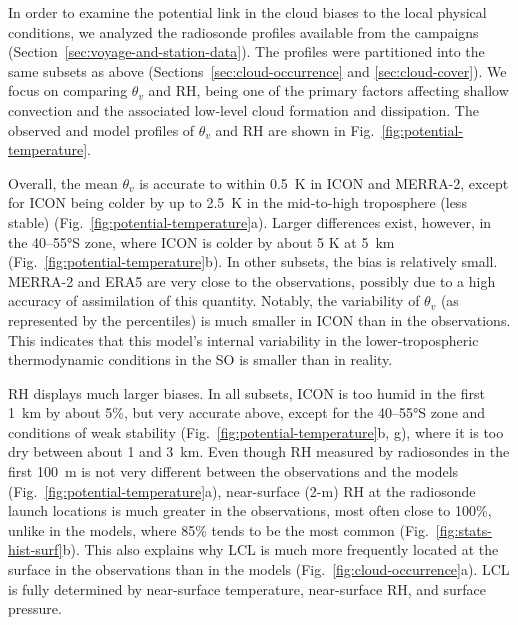 \documentclass[draft]{agujournal2019}
\begin{document}
In order to examine the potential link in the cloud biases to the local physical conditions, we analyzed the radiosonde profiles available from the campaigns (Section~\ref{sec:voyage-and-station-data}). The profiles were partitioned into the same subsets as above (Sections~\ref{sec:cloud-occurrence} and \ref{sec:cloud-cover}). We focus on comparing $\theta_v$ and RH, being one of the primary factors affecting shallow convection and the associated low-level cloud formation and dissipation. The observed and model profiles of $\theta_v$ and RH are shown in Fig.~\ref{fig:potential-temperature}.

Overall, the mean $\theta_v$ is accurate to within 0.5~K in ICON and MERRA-2, except for ICON being colder by up to 2.5~K in the mid-to-high troposphere (less stable) (Fig.~\ref{fig:potential-temperature}a). Larger differences exist, however, in the 40–55°S zone, where ICON is colder by about 5 K at 5~km (Fig.~\ref{fig:potential-temperature}b). In other subsets, the bias is relatively small. MERRA-2 and ERA5 are very close to the observations, possibly due to a high accuracy of assimilation of this quantity. Notably, the variability of $\theta_v$ (as represented by the percentiles) is much smaller in ICON than in the observations. This indicates that this model's internal variability in the lower-tropospheric thermodynamic conditions in the SO is smaller than in reality.

RH displays much larger biases. In all subsets, ICON is too humid in the first 1~km by about 5\%, but very accurate above, except for the 40–55°S zone and conditions of weak stability (Fig.~\ref{fig:potential-temperature}b, g), where it is too dry between about 1 and 3~km. Even though RH measured by radiosondes in the first 100~m is not very different between the observations and the models (Fig.~\ref{fig:potential-temperature}a), near-surface (2-m) RH at the radiosonde launch locations is much greater in the observations, most often close to 100\%, unlike in the models, where 85\% tends to be the most common (Fig.~\ref{fig:stats-hist-surf}b). This also explains why LCL is much more frequently located at the surface in the observations than in the models (Fig.~\ref{fig:cloud-occurrence}a). LCL is fully determined by near-surface temperature, near-surface RH, and surface pressure.
\end{document}
